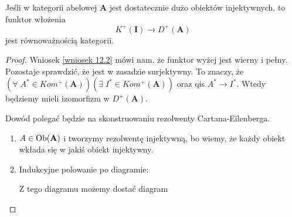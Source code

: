 \begin{theorem}
  Jeśli w kategorii abelowej $\mathbf{A}$ jest dostatecznie dużo obiektów injektywnych, to funktor włożenia
  $$K^+(\mathbf{I})\to D^+(\mathbf{A})$$
  jest równoważnością kategorii.
\end{theorem}

\begin{proof}
  Wniosek \ref{wniosek 12.2} mówi nam, że funktor wyżej jest wierny i pełny. Pozostaje sprawdzić, że jest w zasadzie surjektywny. To znaczy, że $(\forall\;A^*\in Kom^+(\mathbf{A}))(\exists\;I^*\in Kom^+(\mathbf{A}))$ oraz qis $A^*\to I^*$. Wtedy będziemy mieli izomorfizm w $D^+(\mathbf{A})$.

  Dowód polegać będzie na skonstruowaniu rezolwenty Cartana-Eilenberga.
  \begin{enumerate}
    \item $A\in\ob(\mathbf{A})$ i tworzymy rezolwentę injektywną, bo wiemy, że każdy obiekt wkłada się w jakiś obiekt injektywny.
      \begin{center}\end{center}
    \item Indukcyjne polowanie po diagramie:
      \begin{center}\end{center}
      Z tego diagramu możemy dostać diagram
      \begin{center}\begin{tikzcd}

\end{tikzcd}
\end{center}
\end{enumerate}
\end{proof}
